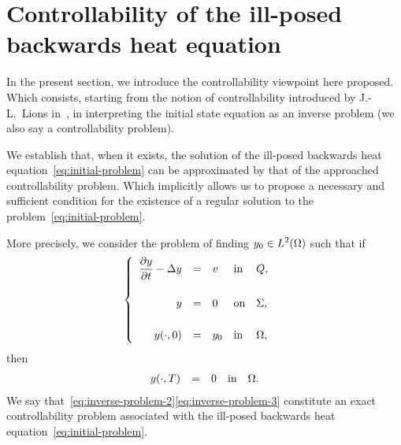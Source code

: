 \section{Controllability of the ill-posed backwards heat
equation}\label{sec:controllability}

In the present section, we introduce the controllability viewpoint here
proposed. Which consists, starting from the notion of controllability
introduced by J.-L.~Lions in~\cite[222]{lions1}, in interpreting the
initial state equation as an inverse problem (we also say a controllability
problem).

We establish that, when it exists, the solution of the ill-posed backwards
heat equation~\eqref{eq:initial-problem} can be approximated by that of the
approached controllability problem. Which implicitly allows us to propose a
necessary and sufficient condition for the existence of a regular solution
to the problem~\eqref{eq:initial-problem}.

More precisely, we consider the problem of finding $\displaystyle
y_{0}\in L^{2}\!\left({\Omega}\right)$ such that if
\begin{equation}\label{eq:inverse-problem-2}
    \begin{cases}\displaystyle
        \begin{array}{rclll}
            \dfrac{\partial{}y}{\partial{}t} - \Delta y & = & v & \text{in} & Q,\\
            \\
            y & = & 0 & \text{on} & \Sigma,\\
            \\
            {y}\!\left({\cdot, 0}\right) & = & y_{0} & \text{in} & \Omega,
        \end{array}
    \end{cases}
\end{equation}
then
\begin{equation}\label{eq:inverse-problem-3}
    \begin{array}{rclll}
        {y}\!\left({\cdot,T}\right) & = & 0 & \text{in} & \Omega.
    \end{array}
\end{equation}
We say that~\eqref{eq:inverse-problem-2}\eqref{eq:inverse-problem-3}
constitute an exact controllability problem associated with the ill-posed
backwards heat equation~\eqref{eq:initial-problem}.

